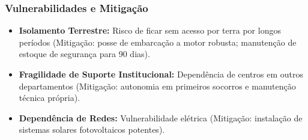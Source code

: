 \subsubsection{Vulnerabilidades e
Mitigação}

\begin{itemize}
\tightlist
\item
  \textbf{Isolamento Terrestre:} Risco de ficar sem acesso por terra por
  longos períodos (Mitigação: posse de embarcação a motor robusta;
  manutenção de estoque de segurança para 90 dias).
\item
  \textbf{Fragilidade de Suporte Institucional:} Dependência de centros
  em outros departamentos (Mitigação: autonomia em primeiros socorros e
  manutenção técnica própria).
\item
  \textbf{Dependência de Redes:} Vulnerabilidade elétrica (Mitigação:
  instalação de sistemas solares fotovoltaicos potentes).
\end{itemize}

